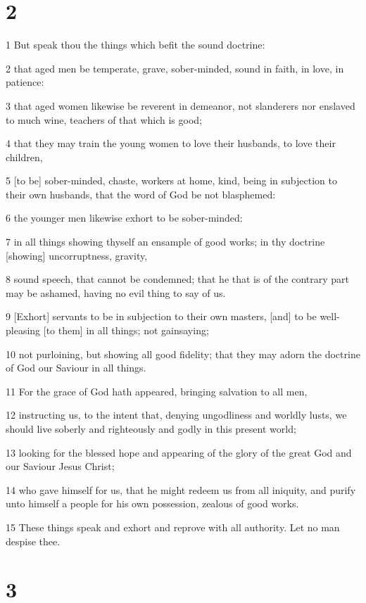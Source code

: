 \chapter{2}

\par 1 But speak thou the things which befit the sound doctrine:
\par 2 that aged men be temperate, grave, sober-minded, sound in faith, in love, in patience:
\par 3 that aged women likewise be reverent in demeanor, not slanderers nor enslaved to much wine, teachers of that which is good;
\par 4 that they may train the young women to love their husbands, to love their children,
\par 5 [to be] sober-minded, chaste, workers at home, kind, being in subjection to their own husbands, that the word of God be not blasphemed:
\par 6 the younger men likewise exhort to be sober-minded:
\par 7 in all things showing thyself an ensample of good works; in thy doctrine [showing] uncorruptness, gravity,
\par 8 sound speech, that cannot be condemned; that he that is of the contrary part may be ashamed, having no evil thing to say of us.
\par 9 [Exhort] servants to be in subjection to their own masters, [and] to be well-pleasing [to them] in all things; not gainsaying;
\par 10 not purloining, but showing all good fidelity; that they may adorn the doctrine of God our Saviour in all things.
\par 11 For the grace of God hath appeared, bringing salvation to all men,
\par 12 instructing us, to the intent that, denying ungodliness and worldly lusts, we should live soberly and righteously and godly in this present world;
\par 13 looking for the blessed hope and appearing of the glory of the great God and our Saviour Jesus Christ;
\par 14 who gave himself for us, that he might redeem us from all iniquity, and purify unto himself a people for his own possession, zealous of good works.
\par 15 These things speak and exhort and reprove with all authority. Let no man despise thee.

\chapter{3}


